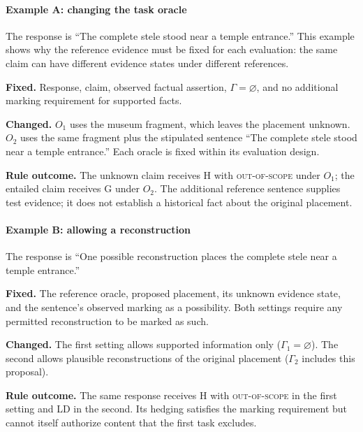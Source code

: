 \documentclass{clv2025}
\newcommand{\LD}{\textsc{LD}}
\newcommand{\Hall}{\textsc{H}}
\newcommand{\Grd}{\textsc{G}}
\begin{document}
\paragraph{Example A: changing the task oracle}
The response is ``The complete stele stood near a temple entrance.''
This example shows why the reference evidence must be fixed for each
evaluation: the same claim can have different evidence states under
different references.
\par\textbf{Fixed.} Response, claim, observed factual assertion,
$\Gamma=\varnothing$, and no additional marking requirement for supported facts.
\par\textbf{Changed.} $O_1$ uses the museum fragment, which leaves the
placement unknown. $O_2$ uses the same fragment plus the stipulated sentence
``The complete stele stood near a temple entrance.'' Each oracle is fixed
within its evaluation design.
\par\textbf{Rule outcome.} The unknown claim receives \Hall{} with
\textsc{out-of-scope} under $O_1$; the entailed claim receives \Grd{} under
$O_2$. The additional reference sentence supplies test evidence; it does
not establish a historical fact about the original placement.

\paragraph{Example B: allowing a reconstruction}
The response is ``One possible reconstruction places the complete stele
near a temple entrance.''
\par\textbf{Fixed.} The reference oracle, proposed placement, its unknown
evidence state, and the sentence's observed marking as a possibility.
Both settings require any permitted reconstruction to be marked as such.
\par\textbf{Changed.} The first setting allows supported information only
($\Gamma_1=\varnothing$). The second allows plausible reconstructions of the
original placement ($\Gamma_2$ includes this proposal).
\par\textbf{Rule outcome.} The same response receives \Hall{} with
\textsc{out-of-scope} in the first setting and \LD{} in the second.
Its hedging satisfies the marking requirement but cannot itself authorize
content that the first task excludes.
\end{document}
